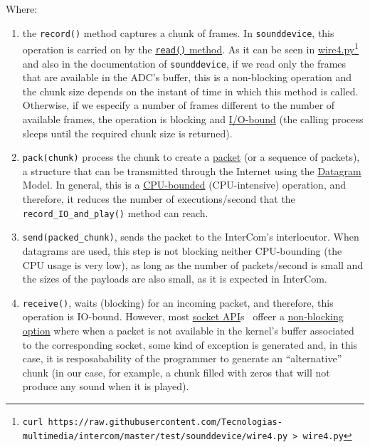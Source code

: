 Where:

\begin{enumerate}
\item the \verb|record()| method captures a chunk of frames. In
  \verb|sounddevice|, this operation is carried on by the
  \href{https://python-sounddevice.readthedocs.io/en/0.4.0/api/streams.html#sounddevice.Stream.read}{\texttt{read()}
    method}. As it can be seen in
  \href{https://raw.githubusercontent.com/Tecnologias-multimedia/intercom/master/test/sounddevice/wire4.py}{wire4.py}\footnote{
  \texttt{curl
    https://raw.githubusercontent.com/Tecnologias-multimedia/intercom/master/test/sounddevice/wire4.py
    > wire4.py}} and also in the documentation of
  \verb|sounddevice|, if we read only the frames that are available
  in the ADC's buffer, this is a non-blocking operation and the chunk
  size depends on the instant of time in which this method is
  called. Otherwise, if we especify a number of frames different to
  the number of available frames, the operation is blocking and
  \href{https://en.wikipedia.org/wiki/I/O_bound}{I/O-bound} (the
  calling process sleeps until the required chunk size is returned).

\item \verb|pack(chunk)| process the chunk to create a
  \href{https://en.wikipedia.org/wiki/Network_packet}{packet} (or a
  sequence of packets), a structure that can be transmitted through
  the Internet using the
  \href{https://en.wikipedia.org/wiki/Datagram}{Datagram} Model. In
  general, this is a
  \href{https://en.wikipedia.org/wiki/CPU-bound}{CPU-bounded}
  (CPU-intensive) operation, and therefore, it reduces the number of
  executions/second that the \verb|record_IO_and_play()| method can
  reach.

\item \verb|send(packed_chunk)|, sends the packet to the
  InterCom's interlocutor. When datagrams are used, this step is
  not blocking neither CPU-bounding (the CPU usage is very low), as
  long as the number of packets/second is small and the sizes of the
  payloads are also small, as it is expected in InterCom.

\item \verb|receive()|, waits (blocking) for an incoming packet, and
  therefore, this operation is IO-bound. However, most
  \href{https://docs.python.org/3/library/socket.html}{socket
    API}s~\cite{python} offeer a
  \href{https://docs.python.org/3.8/library/socket.html#socket.socket.setblocking}{non-blocking
    option} where when a packet is not available in the kernel's
  buffer associated to the corresponding socket, some kind of
  exception is generated and, in this case, it is resposabability of
  the programmer to generate an ``alternative'' chunk (in our case,
  for example, a chunk filled with zeros that will not produce any
  sound when it is played).


\end{enumerate}
